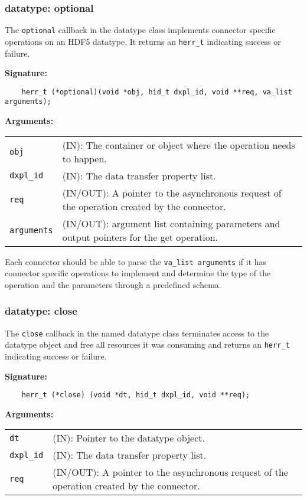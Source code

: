 \subsubsection{datatype: optional}
The \texttt{optional} callback in the datatype class implements connector specific operations on an HDF5 datatype. It returns an \texttt{herr\_t} indicating success or failure.\bigskip 

\begin{mdframed}[style=bgbox]
\textbf{Signature:}
\begin{lstlisting}
    herr_t (*optional)(void *obj, hid_t dxpl_id, void **req, va_list arguments);
\end{lstlisting}

\textbf{Arguments:}\\
\begin{tabular}{l p{13.5cm}}
  \texttt{obj} & (IN): The container or object where the operation needs to happen.\\
  \texttt{dxpl\_id} & (IN): The data transfer property list.\\
  \texttt{req} & (IN/OUT): A pointer to the asynchronous request of the operation created by the connector.\\
  \texttt{arguments} & (IN/OUT): argument list containing parameters and output pointers for the get operation. \\
\end{tabular}
\end{mdframed}

Each connector should be able to parse the \texttt{va\_list arguments} if it has connector specific operations to implement and determine the type of the operation and the parameters through a predefined schema. 

\subsubsection{datatype: close}
The \texttt{close} callback in the named datatype class terminates
access to the datatype object and free all resources it was
consuming and returns an \texttt{herr\_t} indicating success or failure.\bigskip

\begin{mdframed}[style=bgbox]
\textbf{Signature:}
\begin{lstlisting}
    herr_t (*close) (void *dt, hid_t dxpl_id, void **req);
\end{lstlisting}

\textbf{Arguments:}\\
\begin{tabular}{l p{13.5cm}}
  \texttt{dt} & (IN): Pointer to the datatype object.\\
  \texttt{dxpl\_id} & (IN): The data transfer property list.\\
  \texttt{req} & (IN/OUT): A pointer to the asynchronous request of the
  operation created by the connector.\\
\end{tabular}
\end{mdframed}

